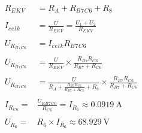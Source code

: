 \begin{equation*}
\begin{aligned}
R_E{_K}{_V} &=R_A+R_B{_7}{_C}{_6}+R_8 \\ \\
I_c{_e}{_l}{_k}&=\frac{U}{R_E{_K}{_V}}=\frac{U_1+U_2}{R_E{_K}{_V}} \\ \\
U_{R{_B}{_7}{_C}{_6}}&=I_c{_e}{_l}{_k}R_B{_7}{_C}{_6}\\ \\
U_{R{_B}{_7}{_C}{_6}}&=\frac{U}{R_E{_K}{_V}}\times \frac{R_B{_7}R_C{_6}}{R_B{_7}+R_C{_6}}\\ \\
U_{R{_B}{_7}{_C}{_6}}&=\frac{U}{R_A+\frac{R_B{_7}R_C{_6}}{R_B{_7}+R_C{_6}}+R_8}\times \frac{R_B{_7}R_C{_6}}{R_B{_7}+R_C{_6}}\\ \\
I_{R{_C}{_6}}=&\frac{U_R{_B}{_7}{_C}{_6}}{R_C{_6}}=I_{R_{6}} \approx  \SI{0.0919}{\ampere}\\ \\
U_{R_{6}}=&R_6\times I_{R_{6}} \approx  \SI{68.929}{\volt}
\end{aligned}
\end{equation*}
